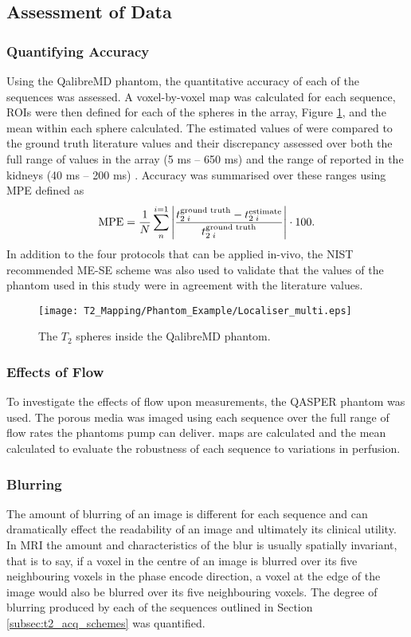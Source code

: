\subsection{Assessment of Data}

\subsubsection{Quantifying Accuracy}
Using the QalibreMD phantom, the quantitative accuracy of each of the sequences was assessed. A voxel-by-voxel \ttwo map was calculated for each sequence, \acp{ROI} were then defined for each of the spheres in the \ttwo array, Figure \ref{fig:t2_phantom_loc}, and the mean \ttwo within each sphere calculated. The estimated values of \ttwo were compared to the ground truth literature values and their discrepancy assessed over both the full range of \ttwo values in the array (5 ms – 650 ms) and the range of \ttwo reported in the kidneys (40 ms – 200 ms) \cite{wolf_magnetic_2018}. Accuracy was summarised over these ranges using \ac{MPE} defined as 
\begin{equation}
	\textup{MPE} = \frac{1}{N}\sum_{n}^{i=1}\left|  \frac{t_{2\; i}^{\textup{ground truth}} - t_{2\; i}^{\textup{estimate}}}{t_{2\; i}^{\textup{ground truth}}}\right| \cdot 100.
	\label{eq:t2_MPE}
\end{equation}
In addition to the four protocols that can be applied in-vivo, the \ac{NIST} recommended ME-SE scheme was also used to validate that the \ttwo values of the phantom used in this study were in agreement with the literature values.

\begin{figure}[H]
	\centering
	\texttt{[image: T2\_Mapping/Phantom\_Example/Localiser\_multi.eps]}
	\caption{The $T_2$ spheres inside the QalibreMD phantom.}
	\label{fig:t2_phantom_loc}	
\end{figure}

\subsubsection{Effects of Flow}
To investigate the effects of flow upon \ttwo measurements, the \ac{QASPER} phantom was used. The porous media was imaged using each sequence over the full range of flow rates the phantoms pump can deliver. \ttwo maps are calculated and the mean \ttwo calculated to evaluate the robustness of each sequence to variations in perfusion.

\newpage
\subsubsection{Blurring}
The amount of blurring of an image is different for each sequence and can dramatically effect the readability of an image and ultimately its clinical utility. In \ac{MRI} the amount and characteristics of the blur is usually spatially invariant, that is to say, if a voxel in the centre of an image is blurred over its five neighbouring voxels in the phase encode direction, a voxel at the edge of the image would also be blurred over its five neighbouring voxels. The degree of blurring produced by each of the sequences outlined in Section \ref{subsec:t2_acq_schemes} was quantified.

